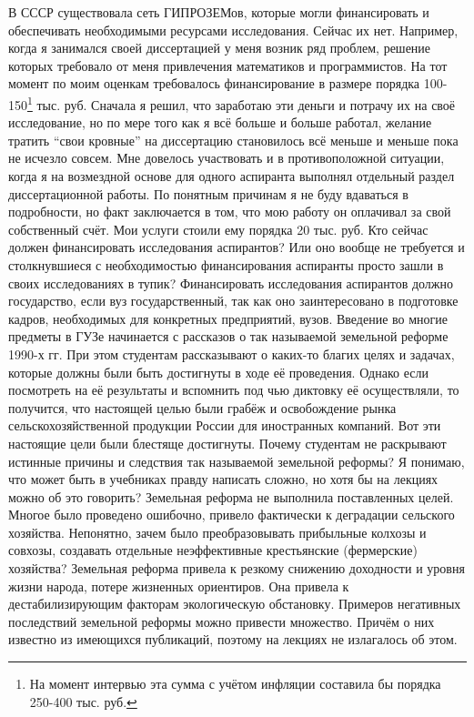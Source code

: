 \begin{drama}
	В СССР существовала сеть ГИПРОЗЕМов, которые могли финансировать и обеспечивать необходимыми ресурсами исследования. Сейчас их нет. Например, когда я занимался своей диссертацией у меня возник ряд проблем, решение которых требовало от меня привлечения математиков и программистов. На тот момент по моим оценкам требовалось финансирование в размере порядка 100-150\footnote{На момент интервью эта сумма с учётом инфляции составила бы порядка 250-400 тыс. руб.} тыс. руб. Сначала я решил, что заработаю эти деньги и потрачу их на своё исследование, но по мере того как я всё больше и больше работал, желание тратить “свои кровные” на диссертацию становилось всё меньше и меньше пока не исчезло совсем. Мне довелось участвовать и в противоположной ситуации, когда я на возмездной основе для одного аспиранта выполнял отдельный раздел диссертационной работы. По понятным причинам я не буду вдаваться в подробности, но факт заключается в том, что мою работу он оплачивал за свой собственный счёт. Мои услуги стоили ему порядка 20 тыс. руб. 
	Кто сейчас должен финансировать исследования аспирантов? Или оно вообще не требуется и столкнувшиеся с необходимостью финансирования аспиранты просто зашли в своих исследованиях в тупик?
	\michaelspeaks Финансировать исследования аспирантов должно государство, если вуз государственный, так как оно заинтересовано в подготовке кадров, необходимых для конкретных предприятий, вузов.
	\maxspeaks Введение во многие предметы в ГУЗе начинается с рассказов о так называемой земельной реформе 1990-х гг. При этом студентам рассказывают о каких-то благих целях и задачах, которые должны были быть достигнуты в ходе её проведения. Однако если посмотреть на её результаты и вспомнить под чью диктовку её осуществляли, то получится, что настоящей целью были грабёж и освобождение рынка сельскохозяйственной продукции России для иностранных компаний. Вот эти настоящие цели были блестяще достигнуты. 
Почему студентам не раскрывают истинные причины и следствия так называемой земельной реформы? Я понимаю, что может быть в учебниках правду написать сложно, но хотя бы на лекциях можно об это говорить?
	\michaelspeaks Земельная реформа не выполнила поставленных целей. Многое было проведено ошибочно, привело фактически к деградации сельского хозяйства. Непонятно, зачем было преобразовывать прибыльные колхозы и совхозы, создавать отдельные неэффективные крестьянские (фермерские) хозяйства?
	Земельная реформа привела к резкому снижению доходности и уровня жизни народа, потере жизненных ориентиров. Она привела к дестабилизирующим факторам экологическую обстановку. Примеров негативных последствий земельной реформы можно привести множество. Причём о них известно из имеющихся публикаций, поэтому на лекциях не излагалось об этом.

\end{drama}
